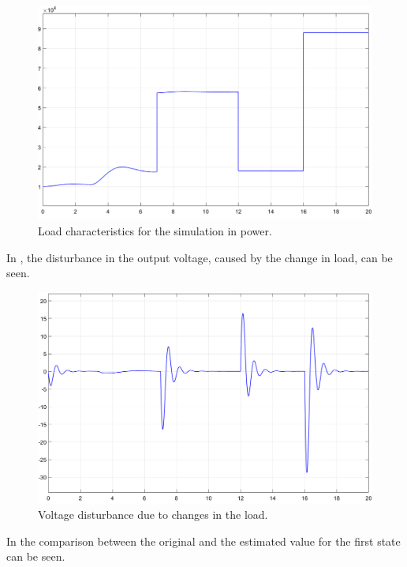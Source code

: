 \begin{figure}[H]
\centering
\includegraphics[width=1\textwidth]{rapport/billeder/temporary/load_power}
\caption{Load characteristics for the simulation in power.}
\label{fig:load_power}
\end{figure}

 In , the disturbance in the output voltage, caused by the change in load, can be seen.

\begin{figure}[H]
\centering
\includegraphics[width=1\textwidth]{rapport/billeder/temporary/load_voltage}
\caption{Voltage disturbance due to changes in the load.}
\label{fig:voltage_dist}
\end{figure}

In  the comparison between the original and the estimated value for the first state can be seen.

